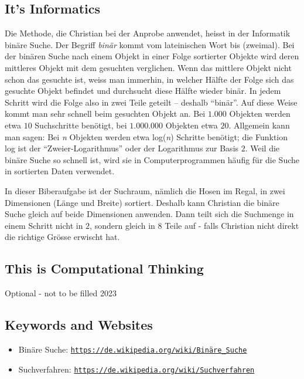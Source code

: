 \documentclass[a4paper,11pt]{report}
\newcommand{\BrochureUrlText}[1]{\texttt{#1}}
\begin{document}
\subsection*{It’s Informatics}

Die Methode, die Christian bei der Anprobe anwendet, heisst in der Informatik binäre Suche. Der Begriff \emph{binär} kommt vom lateinischen Wort bis (zweimal). Bei der binären Suche nach einem Objekt in einer Folge sortierter Objekte wird deren mittleres Objekt mit dem gesuchten verglichen. Wenn das mittlere Objekt nicht schon das gesuchte ist, weiss man immerhin, in welcher Hälfte der Folge sich das gesuchte Objekt befindet und durchsucht diese Hälfte wieder binär. In jedem Schritt wird die Folge also in zwei Teile geteilt – deshalb \enquote{binär}. Auf diese Weise kommt man sehr schnell beim gesuchten Objekt an. Bei $1.000$ Objekten werden etwa $10$ Suchschritte benötigt, bei $1.000$.$000$ Objekten etwa $20$. Allgemein kann man sagen: Bei \emph{n} Objekten werden etwa log(\emph{n}) Schritte benötigt; die Funktion log ist der \enquote{Zweier-Logarithmus} oder der Logarithmus zur Basis $2$. Weil die binäre Suche so schnell ist, wird sie in Computerprogrammen häufig für die Suche in sortierten Daten verwendet.

In dieser Biberaufgabe ist der Suchraum, nämlich die Hosen im Regal, in zwei Dimensionen (Länge und Breite) sortiert. Deshalb kann Christian die binäre Suche gleich auf beide Dimensionen anwenden. Dann teilt sich die Suchmenge in einem Schritt nicht in $2$, sondern gleich in $8$ Teile auf - falls Christian nicht direkt die richtige Grösse erwischt hat.


\subsection*{This is Computational Thinking}

Optional - not to be filled 2023

{\raggedright

\subsection*{Keywords and Websites}

\begin{itemize}
  \item Binäre Suche: \href{https://de.wikipedia.org/wiki/Bin\%C3\%A4re_Suche}{\BrochureUrlText{https://de.wikipedia.org/wiki/Binäre\_Suche}}
  \item Suchverfahren: \href{https://de.wikipedia.org/wiki/Suchverfahren}{\BrochureUrlText{https://de.wikipedia.org/wiki/Suchverfahren}}
\end{itemize}


}
\end{document}

